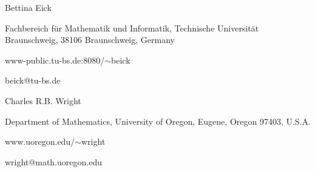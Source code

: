 
Bettina Eick

Fachbereich f\"ur Mathematik und Informatik, Technische Universit\"at
Braunschweig, 38106 Braunschweig, Germany

www-public.tu-bs.de:8080/$\sim$beick

beick@tu-bs.de

\bigskip

Charles R.B. Wright

Department of Mathematics, University of Oregon, Eugene, Oregon 97403, U.S.A.

www.uoregon.edu/$\sim$wright

wright@math.uoregon.edu
